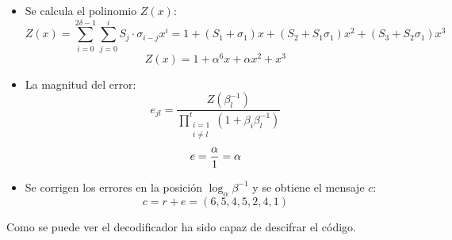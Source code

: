 \begin{itemize}
	\item Se calcula el polinomio \(Z(x)\):
	\begin{equation}
		Z(x)=\sum_{i=0}^{2\delta-1}\sum_{j=0}^i S_j\cdot \sigma_{i-j} x^i=1+(S_1+\sigma_1)x+(S_2+S_1\sigma_1)x^2+(S_3+S_2\sigma_1)x^3
	\end{equation}
	\begin{equation}
		Z(x)=1+\alpha^6x+\alpha x^2 + x^3
	\end{equation}
	\item La magnitud del error:
	\begin{equation}
		e_{jl}=\dfrac{Z(\beta_l^{-1})}{\prod\limits_{\substack{i=1 \\ i \neq l}}^t \left( 1 + \beta_i \beta_l^{-1} \right)}
	\end{equation}
	\begin{equation}
			e=\dfrac{\alpha}{1}=\alpha\\
	\end{equation}
	\item Se corrigen los errores en la posición \(\log_\alpha{\beta^{-1}}\) y se obtiene el mensaje \(c\):
	\begin{equation}
		c=r+e=(6,5,4,5,2,4,1)
	\end{equation}
	
\end{itemize}

Como se puede ver el decodificador ha sido capaz de descifrar el código.